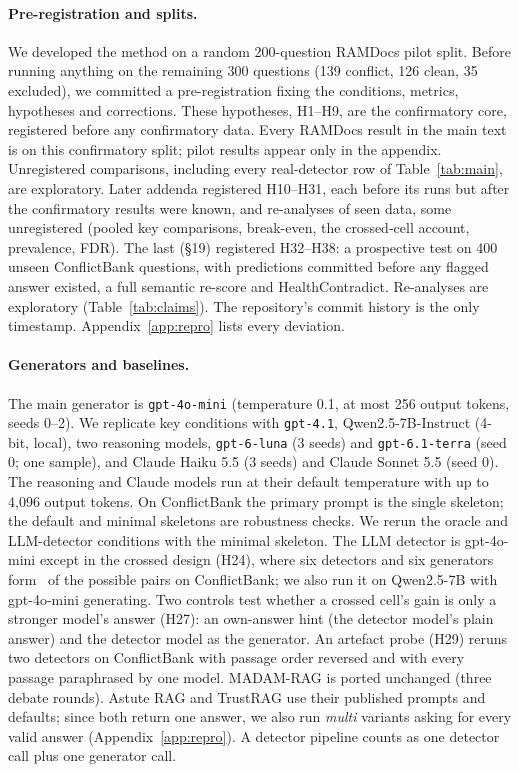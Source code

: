 \paragraph{Pre-registration and splits.}
We developed the method on a random 200-question RAMDocs pilot split. Before running anything on the remaining 300
questions (139 conflict, 126 clean, 35 excluded), we committed a pre-registration fixing the conditions, metrics,
hypotheses and corrections. These hypotheses, H1--H9, are the confirmatory core, registered before any confirmatory
data. Every RAMDocs result in the main text is on this confirmatory split; pilot results appear only in the appendix.
Unregistered comparisons, including every real-detector row of Table~\ref{tab:main}, are exploratory.
Later addenda registered H10--H31, each before its runs but after the confirmatory results were known, and
re-analyses of seen data, some unregistered (pooled key comparisons, break-even, the crossed-cell account,
prevalence, FDR). The last (\S19) registered H32--H38: a prospective test on 400 unseen ConflictBank questions, with
predictions committed before any flagged answer existed, a full semantic re-score and HealthContradict. Re-analyses
are exploratory (Table~\ref{tab:claims}). The repository's commit history is the only timestamp. Appendix~\ref{app:repro} lists every deviation.

\paragraph{Generators and baselines.}
The main generator is \texttt{gpt-4o-mini} \citep{openai2024gpt4o} (temperature 0.1, at most 256 output tokens, seeds
0--2). We replicate key conditions with \texttt{gpt-4.1}, Qwen2.5-7B-Instruct \citep{yang2024qwen25} (4-bit, local),
two reasoning models, \texttt{gpt-6-luna} (3 seeds) and \texttt{gpt-6.1-terra} (seed 0; one sample), and
Claude Haiku 5.5 (3 seeds) and Claude Sonnet 5.5 (seed 0). The reasoning and Claude models run at their default
temperature with up to 4,096 output tokens. On ConflictBank the primary prompt is
the single skeleton; the default and minimal skeletons are robustness checks. We rerun the oracle and LLM-detector
conditions with the minimal skeleton.
The LLM detector is gpt-4o-mini except in the crossed design (H24), where six detectors and six generators form
\hTwentyFourCells\ of the possible pairs on ConflictBank; we also run it on Qwen2.5-7B with gpt-4o-mini generating. Two controls test
whether a crossed cell's gain is only a stronger model's answer (H27): an own-answer hint (the detector model's plain
answer) and the detector model as the generator. An artefact probe (H29) reruns two detectors on
ConflictBank with passage order reversed and with every passage paraphrased by one model.
MADAM-RAG \citep{wang2025madam} is ported unchanged (three debate rounds). Astute RAG \citep{wang2025astute} and
TrustRAG \citep{zhou2025trustrag} use their published prompts and defaults; since both return one answer, we also run
\emph{multi} variants asking for every valid answer (Appendix~\ref{app:repro}). A detector pipeline counts as one
detector call plus one generator call.

